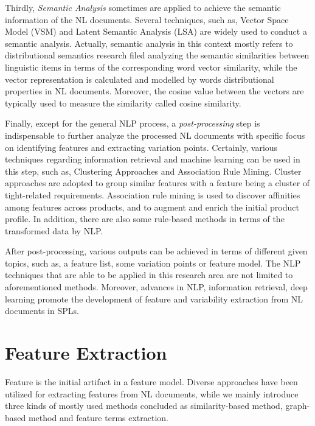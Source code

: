 \documentclass[graybox]{svmult}
\begin{document}
Thirdly, \emph{Semantic Analysis} sometimes are applied to achieve the semantic information of the NL documents. Several techniques, such as, Vector Space Model (VSM) and Latent Semantic Analysis (LSA) are widely used to conduct a semantic analysis. Actually, semantic analysis in this context mostly refers to distributional semantics research filed analyzing the semantic similarities between linguistic items in terms of the corresponding word vector similarity, while the vector representation is calculated and modelled by words distributional properties in NL documents. Moreover, the cosine value between the vectors are typically used to measure the similarity called cosine similarity.

Finally, except for the  general NLP process, a \emph{post-processing} step is indispensable to further analyze the processed NL documents with specific focus on identifying features and extracting variation points. Certainly, various techniques regarding information retrieval and machine learning can be used in this step, such as, Clustering Approaches and Association Rule Mining. Cluster approaches are adopted to group similar features with a feature being a cluster of tight-related requirements. Association rule mining is used to discover affinities among features across products, and to augment and enrich the initial product profile. In addition, there are also some rule-based methods in terms of the transformed data by NLP. 

After post-processing, various outputs can be achieved in terms of different given topics, such as, a feature list, some variation points or feature model. The NLP techniques that are able to be applied in this research area are not limited to aforementioned methods. Moreover, advances in NLP, information retrieval, deep learning promote the development of feature and variability extraction from NL documents in SPLs.

\section{Feature Extraction}
\label{sec:feature}


Feature is the initial artifact in a feature model. Diverse approaches have been utilized for extracting features from NL documents, while we mainly introduce three kinds of mostly used methods concluded as similarity-based method, graph-based method and feature terms extraction.
\end{document}
